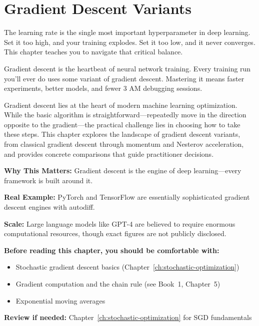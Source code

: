 \documentclass[../../main.tex]{subfiles}
\begin{document}
\chapter{Gradient Descent Variants}
\label{ch:gradient-descent}

The learning rate is the single most important hyperparameter in deep learning. Set it too high, and your training explodes. Set it too low, and it never converges. This chapter teaches you to navigate that critical balance.

\begin{whycare}
Gradient descent is the heartbeat of neural network training. Every training run you'll ever do uses some variant of gradient descent. Mastering it means faster experiments, better models, and fewer 3 AM debugging sessions.
\end{whycare}

\begin{keyconcept}
Gradient descent lies at the heart of modern machine learning optimization. While the basic algorithm is straightforward---repeatedly move in the direction opposite to the gradient---the practical challenge lies in choosing how to take these steps. This chapter explores the landscape of gradient descent variants, from classical gradient descent through momentum and Nesterov acceleration, and provides concrete comparisons that guide practitioner decisions.
\end{keyconcept}

\begin{realworld}
\textbf{Why This Matters:} Gradient descent is the engine of deep learning---every framework is built around it.

\textbf{Real Example:} PyTorch and TensorFlow are essentially sophisticated gradient descent engines with autodiff.

\textbf{Scale:} Large language models like GPT-4 are believed to require enormous computational resources, though exact figures are not publicly disclosed.
\end{realworld}

\begin{prerequisites}
\textbf{Before reading this chapter, you should be comfortable with:}
\begin{itemize}
    \item Stochastic gradient descent basics (Chapter~\ref{ch:stochastic-optimization})
    \item Gradient computation and the chain rule (see Book~1, Chapter~5)
    \item Exponential moving averages
\end{itemize}
\textbf{Review if needed:} Chapter~\ref{ch:stochastic-optimization} for SGD fundamentals
\end{prerequisites}
\end{document}
